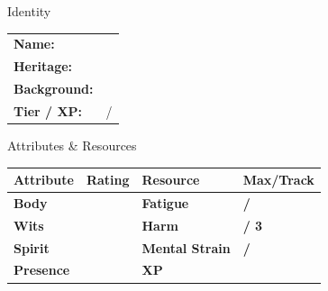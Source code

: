 \documentclass[10pt]{article}
\begin{document}
\begin{minipage}[t]{0.48\linewidth}
    \begin{charbox}{Identity}
        \begin{tabular}{p{2.5cm} p{5cm}}
            \textbf{Name:} & \underline{\hspace{4cm}} \\
            \textbf{Heritage:} & \underline{\hspace{4cm}} \\
            \textbf{Background:} & \underline{\hspace{4cm}} \\
            \textbf{Tier / XP:} & \underline{\hspace{2cm}} / \underline{\hspace{2cm}} \\
        \end{tabular}
    \end{charbox}
    
    \vspace{0.5em}
    
    \begin{charbox}{Attributes \& Resources}
        \begin{tabular}{>{\bfseries}p{2.5cm} >{\bfseries}p{1.5cm} >{\bfseries}p{2.5cm} >{\bfseries}p{1.5cm}}
            \toprule
            \textbf{Attribute} & \textbf{Rating} & \textbf{Resource} & \textbf{Max/Track} \\
            \midrule
            Body & \underline{\hspace{1.5cm}} & Fatigue & \underline{\hspace{1.5cm}} / \underline{\hspace{1.5cm}} \\
            Wits & \underline{\hspace{1.5cm}} & Harm & \underline{\hspace{1.5cm}} / 3 \\
            Spirit & \underline{\hspace{1.5cm}} & Mental Strain & \underline{\hspace{1.5cm}} / \underline{\hspace{1.5cm}} \\
            Presence & \underline{\hspace{1.5cm}} & XP & \underline{\hspace{1.5cm}} \\
            \bottomrule
        \end{tabular}
    \end{charbox}
    

\end{minipage}
\end{document}
